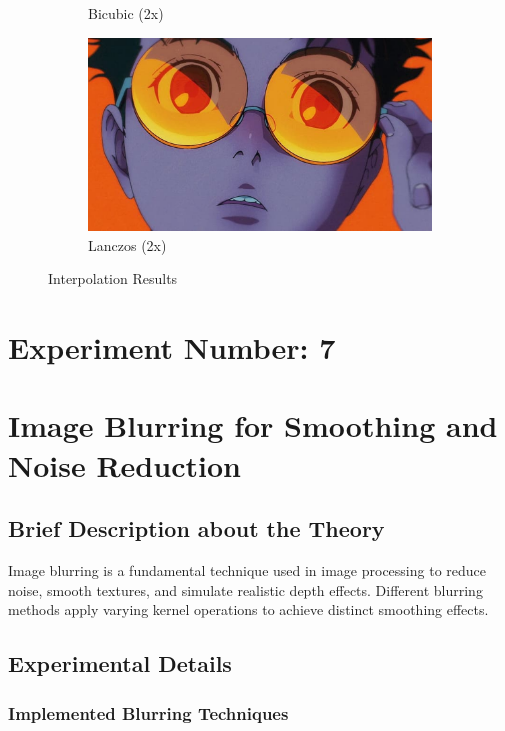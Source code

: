 \documentclass[12pt,a4paper]{article}
\begin{document}
\begin{figure}[H]
\begin{subfigure}[b]{0.45\textwidth}
    \caption{Bicubic (2x)}
  \end{subfigure}
  \hfill
  \begin{subfigure}[b]{0.45\textwidth}
    \includegraphics[width=\textwidth]{interpolation/interpolation_lanczos_2x.jpg}
    \caption{Lanczos (2x)}
  \end{subfigure}
  \caption{Interpolation Results}
  \label{fig:interpolation}
\end{figure}

\newpage
\section*{Experiment Number: 7}
\section{Image Blurring for Smoothing and Noise Reduction}

\subsection{Brief Description about the Theory}
Image blurring is a fundamental technique used in image processing to reduce noise, smooth textures, and simulate realistic depth effects. Different blurring methods apply varying kernel operations to achieve distinct smoothing effects.

\subsection{Experimental Details}
\subsubsection{Implemented Blurring Techniques}
\end{document}
